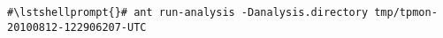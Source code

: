 \begin{lstlisting}[caption=Command to compile and run the instrumented Bookstore via ant]
#\lstshellprompt{}# ant run-analysis -Danalysis.directory tmp/tpmon-20100812-122906207-UTC
\end{lstlisting}
